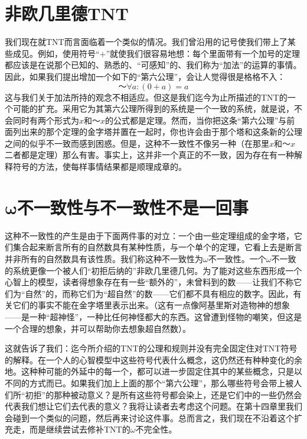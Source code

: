 \section{非欧几里德TNT}

我们现在就TNT而言面临着一个类似的情况。我们曾沿用的记号使我们带上了某些成见。例如，使用符号“$+$”就使我们很容易地想：每个里面带有一个加号的定理都应该是在说那个已知的、熟悉的、“可感知”的、我们称为“加法”的运算的事情。因此，如果我们提出增加一个如下的“第六公理”，会让人觉得很是格格不入：
\[
～\forall a:(0+a)=a
\]
这与我们关于加法所持的观念不相适应。但这是我们迄今为止所描述的TNT的一个可能的扩充。采用它为其第六公理所得到的系统是一个一致的系统，就是说，不会同时有两个形式为$x$和$～x$的公式都是定理。然而，当你把这条“第六公理”与前面列出来的那个定理的金字塔并置在一起时，你也许会由于那个塔和这条新的公理之间的似乎不一致而感到困惑。但是，这种不一致性不像另一种（在那里$x$和$～x$二者都是定理）那么有害。事实上，这并非一个真正的不一致，因为存在有一种解释符号的方法，使每样事情结果都是顺理成章的。

\section{\texorpdfstring{$\symbf{\omega}$}{\textomega}不一致性与不一致性不是一回事}

这种不一致性的产生是由于下面两件事的对立：一个由一些定理组成的金字塔，它们集合起来断言所有的自然数具有某种性质，与一个单个的定理，它看上去是断言并非所有的自然数具有该性质。我们称这种不一致性为$\omega$不一致性。一个$\omega$不一致的系统更像一个被人们“初拒后纳的”非欧几里德几何。为了能对这些东西形成一个心智上的模型，读者得想象存在有一些“额外的”，未曾料到的数——让我们不称它们为“自然”的，而称它们为“超自然”的数——它们都不具有相应的数字。因此，有关它们的事实不能在金字塔里表示出来。（这有一点像阿基里斯对造物神的想象——是一种“超神怪”，一种比任何神怪都大的东西。这曾遭到怪物的嘲笑，但这是一个合理的想象，并可以帮助你去想象超自然数）。

这就告诉了我们：迄今所介绍的TNT的公理和规则并没有完全固定住对TNT符号的解释。在一个人的心智模型中这些符号代表什么概念，这仍然还有种种变化的余地。这种种可能的外延中的每一个，都可以进一步固定住其中的某些概念，只是以不同的方式而已。如果我们加上上面的那个“第六公理”，那么哪些符号会带上被人们所“初拒”的那种被动意义？是所有这些符号都会染上，还是它们中的一些仍然会代表我们想让它们去代表的意义？我将让读者去考虑这个问题。在第十四章里我们会碰到一个类似的问题，然后再来讨论这件事。总而言之，我们现在不沿着这个扩充走，而是继续尝试去修补TNT的$\omega$不完全性。

